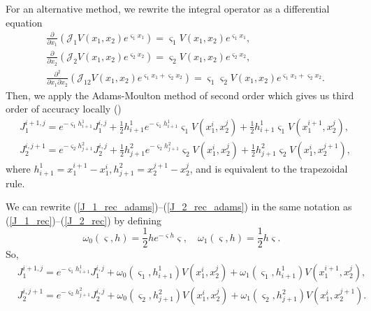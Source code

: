 For an alternative method, we rewrite the integral operator as a differential equation
\begin{align}
		& \frac{\partial}{\partial x_1} \left(\mathcal{J}_1 V(x_1, x_2)e^{\varsigma_1 x_1} \right) =  \varsigma_1 V(x_1, x_2) e^{\varsigma_1 x_1}, \label{J1_ode}\\
		& \frac{\partial}{\partial x_2} \left(\mathcal{J}_2 V(x_1, x_2)e^{\varsigma_2 x_2} \right) =  \varsigma_2 V(x_1, x_2) e^{\varsigma_2 x_2}, \label{J2_ode}\\
		& \frac{\partial^2}{\partial x_1 \partial x_2} \left(\mathcal{J}_{12} V(x_1, x_2)e^{\varsigma_1 x_1 + \varsigma_2 x_2} \right) =  \varsigma_1  \varsigma_2 V(x_1, x_2) e^{\varsigma_1 x_1 + \varsigma_2 x_2}. \label{J12_pde}
\end{align}
Then, we apply the Adams-Moulton method of second order which gives us third order of accuracy locally (\cite{butcher2008numerical})
\begin{align}
	&J_1^{i+1, j} = e^{-\varsigma_1 h^1_{i+1}} J_1^{i, j} + \frac{1}{2} h^1_{i+1} e^{-\varsigma_1 h^1_{i+1}} \varsigma_1  V(x_1^i, x_2^j) + \frac{1}{2} h^1_{i+1} \varsigma_1 V(x_1^{i+1}, x_2^{j}), \label{J_1_rec_adams}\\
	&J_2^{i, j+1} = e^{-\varsigma_2 h^2_{j+1}} J_2^{i, j} +\frac{1}{2} h^2_{j+1} e^{-\varsigma_2 h^2_{j+1}} \varsigma_2  V(x_1^i, x_2^j) + \frac{1}{2} h^2_{j+1} \varsigma_2 V(x_1^{i}, x_2^{j+1}), \label{J_2_rec_adams}
\end{align}
where $h_{i+1}^1 = x_1^{i+1} - x_1^{i}, h_{j+1}^2 = x_2^{j+1} - x_2^{j}$, and is equivalent to the trapezoidal rule.

We can rewrite (\ref{J_1_rec_adams})--(\ref{J_2_rec_adams}) in the same notation as  (\ref{J_1_rec})--(\ref{J_2_rec}) by defining
\begin{equation*}
	\omega_0(\varsigma, h) = \frac{1}{2} h e^{-\varsigma h} \varsigma, \quad \omega_1(\varsigma, h) = \frac{1}{2} h \varsigma.
\end{equation*}
So,
\begin{align*}
	&J_1^{i+1, j} = e^{-\varsigma_1 h^1_{i+1}} J_1^{i, j} + \omega_0(\varsigma_1, h^1_{i+1}) V(x_1^i, x_2^j) + \omega_1(\varsigma_1, h_{i+1}^1) V(x_1^{i+1}, x_2^{j}),\\
	&J_2^{i, j+1} = e^{-\varsigma_2 h^2_{j+1}} J_2^{i, j} + \omega_0(\varsigma_2, h^2_{j+1}) V(x_1^i, x_2^j) + \omega_1(\varsigma_2, h_{j+1}^2) V(x_1^{i}, x_2^{j+1}). 
\end{align*}

